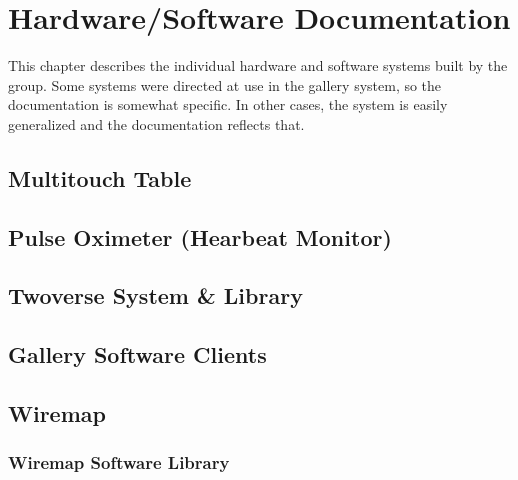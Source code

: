 \chapter{Hardware/Software Documentation}
This chapter describes the individual hardware and software systems built by the group. Some systems were directed at use in the gallery system, so the documentation is somewhat specific. In other cases, the system is easily generalized and the documentation reflects that.

\section{Multitouch Table}

\section{Pulse Oximeter (Hearbeat Monitor)}

\section{Twoverse System \& Library}

\section{Gallery Software Clients}

\section{Wiremap}

\subsection{Wiremap Software Library}



